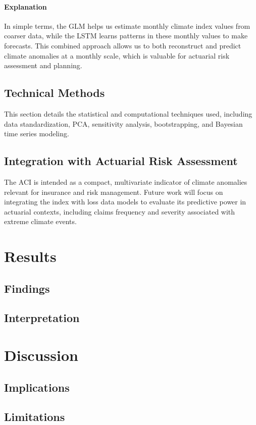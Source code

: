 \documentclass[12pt,a4paper]{report}
\begin{document}
\subsubsection*{Explanation}
In simple terms, the GLM helps us estimate monthly climate index values from coarser data, while the LSTM learns patterns in these monthly values to make forecasts. 
This combined approach allows us to both reconstruct and predict climate anomalies at a monthly scale, which is valuable for actuarial risk assessment and planning.

\section{Technical Methods}
This section details the statistical and computational techniques used, including data standardization, PCA, sensitivity analysis, bootstrapping, 
and Bayesian time series modeling.

\section{Integration with Actuarial Risk Assessment}
The ACI is intended as a compact, multivariate indicator of climate anomalies relevant for insurance and risk management. 
Future work will focus on integrating the index with loss data models to evaluate its predictive power in actuarial contexts, 
including claims frequency and severity associated with extreme climate events.

\chapter{Results}
\section{Findings}
\section{Interpretation}

\chapter{Discussion}
\section{Implications}
\section{Limitations}
\end{document}
